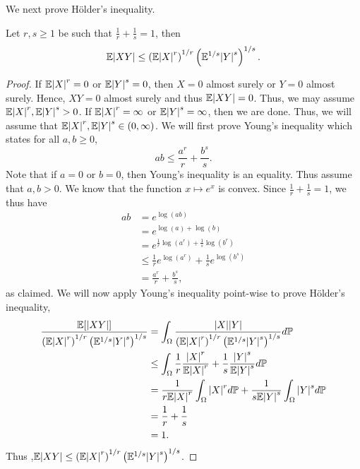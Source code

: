 We next prove H\"{o}lder's inequality.
\begin{proposition}
    Let $r,s \ge 1$ be such that $\frac{1}{r}+\frac{1}{s} = 1$, then 
    \[{\mathbb{E}}{\left\lvert XY\right\rvert} \le \left({\mathbb{E}}{\left\lvert X\right\rvert}^r\right)^{1/r}\left({\mathbb{E}}^{1/s}{\left\lvert Y\right\rvert}^s\right)^{1/s}. \]
\end{proposition}
\begin{proof}
    If ${\mathbb{E}}{\left\lvert X\right\rvert}^r = 0$ or ${\mathbb{E}}{\left\lvert Y\right\rvert}^s = 0$, then $X=0$ almost surely or $Y=0$ almost surely. Hence, $XY = 0$ almost surely and thus ${\mathbb{E}}{\left\lvert XY\right\rvert} = 0$. Thus, we may assume ${\mathbb{E}}{\left\lvert X\right\rvert}^r,{\mathbb{E}}{\left\lvert Y\right\rvert}^s > 0$. If ${\mathbb{E}}{\left\lvert X\right\rvert}^r=\infty$ or ${\mathbb{E}}{\left\lvert Y\right\rvert}^s = \infty$, then we are done. Thus, we will assume that ${\mathbb{E}}{\left\lvert X\right\rvert}^r, {\mathbb{E}}{\left\lvert Y\right\rvert}^s \in (0,\infty)$. We will first prove Young's inequality which states for all $a,b \ge 0$,
    \[ab \le \frac{a^r}{r}+\frac{b^s}{s}. \]
    Note that if $a=0$ or $b=0$, then Young's inequality is an equality. Thus assume that $a,b > 0$. We know that the function $x \mapsto e^x$ is convex. Since $\frac{1}{r}+\frac{1}{s} =1$, we thus have
    \begin{align*}
        ab &= e^{\log(ab)}\\
        &= e^{\log(a)+\log(b)}\\
        &=e^{\frac{1}{r}\log(a^r)+\frac{1}{s}\log(b^r)}\\
        &\le \frac{1}{r}e^{\log(a^r)}+\frac{1}{s}e^{\log(b^s)}\\
        &= \frac{a^r}{r}+\frac{b^s}{s},
    \end{align*}
    as claimed. We will now apply Young's inequality point-wise to prove H\"{o}lder's inequality,
    \begin{align*}
        \frac{{\mathbb{E}}[{\left\lvert XY\right\rvert}]}{\left({\mathbb{E}}{\left\lvert X\right\rvert}^r\right)^{1/r}\left({\mathbb{E}}^{1/s}{\left\lvert Y\right\rvert}^s\right)^{1/s}} &= \int_{{\Omega}} \frac{{\left\lvert X\right\rvert}{\left\lvert Y\right\rvert}}{\left({\mathbb{E}}{\left\lvert X\right\rvert}^r\right)^{1/r}\left({\mathbb{E}}^{1/s}{\left\lvert Y\right\rvert}^s\right)^{1/s}}d{\mathbb{P}}\\
        &\le \int_{{\Omega}} \frac{1}{r}\frac{{\left\lvert X\right\rvert}^r}{{\mathbb{E}}{\left\lvert X\right\rvert}^r}+\frac{1}{s}\frac{{\left\lvert Y\right\rvert}^s}{{\mathbb{E}}{\left\lvert Y\right\rvert}^s}d{\mathbb{P}}\\
        &= \frac{1}{r{\mathbb{E}}{\left\lvert X\right\rvert}^r}\int_{{\Omega}} {\left\lvert X\right\rvert}^rd{\mathbb{P}} +\frac{1}{s{\mathbb{E}}{\left\lvert Y\right\rvert}^s}\int_{{\Omega}} {\left\lvert Y\right\rvert}^sd{\mathbb{P}}\\
        &=\frac{1}{r}+\frac{1}{s}\\
        &=1. 
    \end{align*}
    Thus ,${\mathbb{E}}{\left\lvert XY\right\rvert} \le \left({\mathbb{E}}{\left\lvert X\right\rvert}^r\right)^{1/r}\left({\mathbb{E}}^{1/s}{\left\lvert Y\right\rvert}^s\right)^{1/s}$.
\end{proof}
